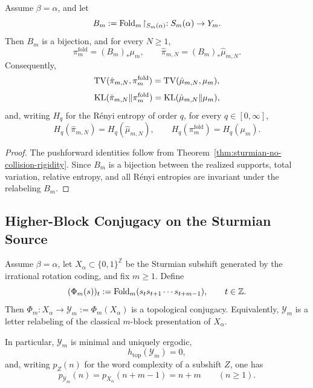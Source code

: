 \begin{corollary}\label{cor:sturmian-exact-relabeling}
Assume \(\beta=\alpha\), and let
\[
B_m:=\mathrm{Fold}_m\!\upharpoonright_{S_m(\alpha)}:S_m(\alpha)\to Y_m.
\]
Then \(B_m\) is a bijection, and for every \(N\ge 1\),
\[
\pi_m^{\mathrm{fold}}=(B_m)_*\mu_m,
\qquad
\hat\pi_{m,N}=(B_m)_*\hat\mu_{m,N}.
\]
Consequently,
\[
\operatorname{TV}(\hat\pi_{m,N},\pi_m^{\mathrm{fold}})
=
\operatorname{TV}(\hat\mu_{m,N},\mu_m),
\]
\[
\operatorname{KL}(\hat\pi_{m,N}\|\pi_m^{\mathrm{fold}})
=
\operatorname{KL}(\hat\mu_{m,N}\|\mu_m),
\]
and, writing \(H_q\) for the R\'enyi entropy of order \(q\), for every
\(q\in[0,\infty]\),
\[
H_q(\hat\pi_{m,N})=H_q(\hat\mu_{m,N}),
\qquad
H_q(\pi_m^{\mathrm{fold}})=H_q(\mu_m).
\]
\end{corollary}

\begin{proof}
The pushforward identities follow from Theorem~\ref{thm:sturmian-no-collision-rigidity}.
Since \(B_m\) is a bijection between the realized supports, total variation,
relative entropy, and all R\'enyi entropies are invariant under the relabeling
\(B_m\).
\end{proof}

\subsection{Higher-Block Conjugacy on the Sturmian Source}

\begin{theorem}
\label{thm:sequence-level-transparency}
Assume \(\beta=\alpha\), let \(X_\alpha\subset\{0,1\}^{\mathbb{Z}}\) be the
Sturmian subshift generated by the irrational rotation coding, and fix
\(m\ge 1\). Define
\[
(\Phi_m(s))_t:=\mathrm{Fold}_m(s_t s_{t+1}\cdots s_{t+m-1}),
\qquad t\in\mathbb{Z}.
\]
Then \(\Phi_m:X_\alpha\to \mathcal{Y}_m:=\Phi_m(X_\alpha)\) is a topological
conjugacy. Equivalently, \(\mathcal{Y}_m\) is a letter relabeling of the
classical \(m\)-block presentation of \(X_\alpha\).

In particular, \(\mathcal{Y}_m\) is minimal and uniquely ergodic,
\[
h_{\mathrm{top}}(\mathcal{Y}_m)=0,
\]
and, writing \(p_Z(n)\) for the word complexity of a subshift \(Z\), one has
\[
p_{\mathcal{Y}_m}(n)=p_{X_\alpha}(n+m-1)=n+m
\qquad (n\ge 1).
\]
\end{theorem}

